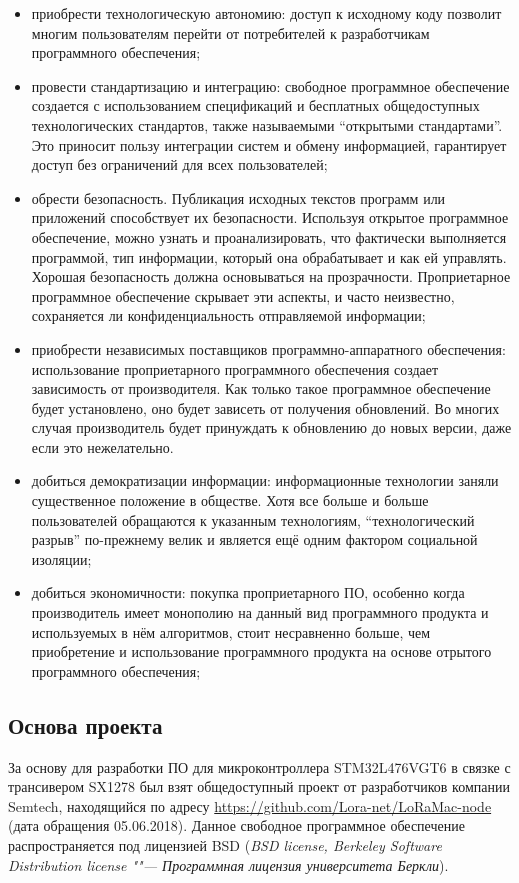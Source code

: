 \begin{itemize}
 \item приобрести технологическую автономию: доступ к исходному коду позволит 
многим пользователям перейти от потребителей к разработчикам программного 
обеспечения;
 \item провести стандартизацию и интеграцию: свободное программное обеспечение 
создается с использованием спецификаций и бесплатных общедоступных 
технологических стандартов, также называемыми ``открытыми стандартами''. Это 
приносит пользу интеграции систем и обмену информацией, гарантирует 
 доступ без ограничений для всех пользователей;
 \item обрести безопасность. Публикация исходных текстов программ или 
приложений способствует их безопасности. Используя открытое программное 
обеспечение, можно узнать и проанализировать, что фактически выполняется 
программой, тип информации, который она обрабатывает и как ей управлять. 
Хорошая 
безопасность должна основываться на прозрачности. Проприетарное программное 
обеспечение скрывает эти аспекты, и часто неизвестно, сохраняется ли 
конфиденциальность отправляемой информации;
 \item приобрести независимых поставщиков программно-аппаратного обеспечения: 
использование проприетарного программного обеспечения создает зависимость от 
производителя. Как только такое программное обеспечение будет установлено, оно 
будет зависеть от получения обновлений. Во многих случая производитель будет 
принуждать к обновлению до новых версии, даже если это нежелательно.
 \item добиться демократизации информации: информационные технологии заняли 
существенное положение в обществе. Хотя все больше и больше пользователей 
обращаются к указанным технологиям, ``технологический разрыв'' по-прежнему 
велик 
и является ещё одним фактором социальной изоляции;
 \item добиться экономичности: покупка проприетарного ПО, особенно когда 
производитель имеет монополию на данный вид программного продукта и 
используемых в нём алгоритмов, стоит несравненно больше, чем приобретение и 
использование программного продукта на основе отрытого программного 
обеспечения;
\end{itemize}

\subsection{Основа проекта}

За основу для разработки ПО для микроконтроллера STM32L476VGT6 в связке с 
трансивером SX1278 был взят общедоступный проект от разработчиков компании 
Semtech, находящийся по адресу \url{https://github.com/Lora-net/LoRaMac-node} 
(дата обращения 05.06.2018).
Данное свободное программное обеспечение распространяется под лицензией BSD 
(\textit{BSD license, Berkeley Software Distribution license ""--- Программная 
лицензия университета Беркли}).

